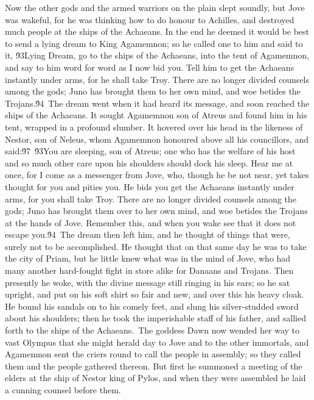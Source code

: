 {  Now the other gods and the armed warriors on the plain slept soundly, but Jove was wakeful, for he was thinking how to do honour to Achilles, and destroyed much people at the ships of the Achaeans. In the end he deemed it would be best to send a lying dream to King Agamemnon; so he called one to him and said to it, \'93Lying Dream, go to the ships of the Achaeans, into the tent of Agamemnon, and say to him word for word as I now bid you. Tell him to get the Achaeans instantly under arms, for he shall take Troy. There are no longer divided counsels among the gods; Juno has brought them to her own mind, and woe betides the Trojans.\'94\
The dream went when it had heard its message, and soon reached the ships of the Achaeans. It sought Agamemnon son of Atreus and found him in his tent, wrapped in a profound slumber. It hovered over his head in the likeness of Nestor, son of Neleus, whom Agamemnon honoured above all his councillors, and said:\'97\
\'93You are sleeping, son of Atreus; one who has the welfare of his host and so much other care upon his shoulders should dock his sleep. Hear me at once, for I come as a messenger from Jove, who, though he be not near, yet takes thought for you and pities you. He bids you get the Achaeans instantly under arms, for you shall take Troy. There are no longer divided counsels among the gods; Juno has brought them over to her own mind, and woe betides the Trojans at the hands of Jove. Remember this, and when you wake see that it does not escape you.\'94\
The dream then left him, and he thought of things that were, surely not to be accomplished. He thought that on that same day he was to take the city of Priam, but he little knew what was in the mind of Jove, who had many another hard-fought fight in store alike for Danaans and Trojans. Then presently he woke, with the divine message still ringing in his ears; so he sat upright, and put on his soft shirt so fair and new, and over this his heavy cloak. He bound his sandals on to his comely feet, and slung his silver-studded sword about his shoulders; then he took the imperishable staff of his father, and sallied forth to the ships of the Achaeans.\
The goddess Dawn now wended her way to vast Olympus that she might herald day to Jove and to the other immortals, and Agamemnon sent the criers round to call the people in assembly; so they called them and the people gathered thereon. But first he summoned a meeting of the elders at the ship of Nestor king of Pylos, and when they were assembled he laid a cunning counsel before them.\
}
